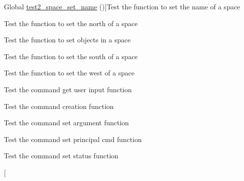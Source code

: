 \begin{DoxyRefList}
%
Global \hyperlink{space__test_8c_a5a868ba017602ba6b58447cb394e81a6}{test2\+\_\+space\+\_\+set\+\_\+name} ()]Test the function to set the name of a space  
\item[\label{test__test000157}%
\Hypertarget{test__test000157}%
Global \hyperlink{space__test_8c_a3bc7fe26c1e36ffd195099a9983206e1}{test2\+\_\+space\+\_\+set\+\_\+north} ()]Test the function to set the north of a space  
\item[\label{test__test000165}%
\Hypertarget{test__test000165}%
Global \hyperlink{space__test_8c_a6349e2b547c71dee23b96d8bbf7a1806}{test2\+\_\+space\+\_\+set\+\_\+object} ()]Test the function to set objects in a space  
\item[\label{test__test000159}%
\Hypertarget{test__test000159}%
Global \hyperlink{space__test_8c_ac9f950741f12ccfcc5ad5d9e71d3d90a}{test2\+\_\+space\+\_\+set\+\_\+south} ()]Test the function to set the south of a space  
\item[\label{test__test000163}%
\Hypertarget{test__test000163}%
Global \hyperlink{space__test_8c_aa51b05ffd99b7bbd8f2dfc23c8f85870}{test2\+\_\+space\+\_\+set\+\_\+west} ()]Test the function to set the west of a space  
\item[\label{test__test000027}%
\Hypertarget{test__test000027}%
Global \hyperlink{command__test_8c_ae2d4b758fa9767317795c822b7334dec}{test3\+\_\+command\+\_\+get\+\_\+user\+\_\+input} ()]Test the command get user input function  
\item[\label{test__test000003}%
\Hypertarget{test__test000003}%
Global \hyperlink{command__test_8c_a1d44a3ed59cc78359d6c8c0d720347e1}{test3\+\_\+command\+\_\+init} ()]Test the command creation function  
\item[\label{test__test000022}%
\Hypertarget{test__test000022}%
Global \hyperlink{command__test_8c_a69324b158668120d802451ce7c951d9e}{test3\+\_\+command\+\_\+set\+\_\+argument} ()]Test the command set argument function  
\item[\label{test__test000007}%
\Hypertarget{test__test000007}%
Global \hyperlink{command__test_8c_a7e2613ae40c77091d31e9dd549c5d848}{test3\+\_\+command\+\_\+set\+\_\+principal\+\_\+cmd} ()]Test the command set principal cmd function  
\item[\label{test__test000019}%
\Hypertarget{test__test000019}%
Global \hyperlink{command__test_8c_a5c554b37bf888c3077aa310982cedf14}{test3\+\_\+command\+\_\+set\+\_\+status} ()]Test the command set status function  
\item[\label{test__test000055}%

\end{DoxyRefList}
